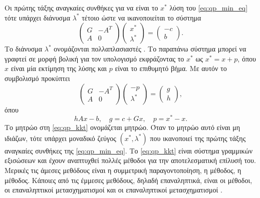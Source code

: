 Οι πρώτης τάξης αναγκαίες συνθήκες για να είναι το $x^*$ λύση του
\eqref{eq:qp_min_eq} τότε υπάρχει διάνυσμα $\lambda^*$ τέτοιο ώστε να
ικανοποιείται το σύστημα
\begin{equation*}
    \begin{pmatrix}
        G & -A^T \\
        A & 0
    \end{pmatrix}
    \begin{pmatrix}
        x^* \\
        \lambda^*
    \end{pmatrix}=
    \begin{pmatrix}
        -c \\
        b
    \end{pmatrix}.
\end{equation*}
Το διάνυσμα $\lambda^*$ ονομάζονται πολλαπλασιαστές . Το παραπάνω
σύστημα μπορεί να γραφτεί σε μορφή βολική για τον υπολογισμό εκφράζοντας το
$x^*$ ως $x^* = x + p$, όπου $x$ είναι μία εκτίμηση της λύσης και $p$ είναι το
επιθυμητό βήμα. Με αυτόν το συμβολισμό προκύπτει
\begin{equation}\label{eq:qp_kkt}
    \begin{pmatrix}
        G & -A^T \\
        A & 0
    \end{pmatrix}
    \begin{pmatrix}
        -p \\
        \lambda^*
    \end{pmatrix}=
    \begin{pmatrix}
        g \\
        h
    \end{pmatrix},
\end{equation}
όπου
\begin{equation*}
    h Ax - b, \quad g = c + Gx, \quad p= x^* - x.
\end{equation*}
Το μητρώο στη \eqref{eq:qp_kkt} ονομάζεται  μητρώο. Όταν
το μητρώο αυτό είναι μη ιδιάζων, τότε υπάρχει μοναδικό ζεύγος
$(x^*, \lambda^*)$ που ικανοποιεί της πρώτης τάξης αναγκαίες συνθήκες της
\eqref{eq:qp_min_eq}. Το \eqref{eq:qp_kkt} είναι σύστημα γραμμικών εξισώσεων και
έχουν αναπτυχθεί πολλές μέθοδοι για την αποτελεσματική επίλυσή του. Μερικές τις
άμεσες μεθόδους είναι η συμμετρική παραγοντοποίηση, η  μέθοδος,
η  μέθοδος. Κάποιες από τις έμμεσες μεθόδους, δηλαδή
επαναληπτικά, είναι οι  μέθοδοι, οι επαναληπτικοί μετασχηματισμοί
 και οι επαναληπτικοί μετασχηματισμοί .

